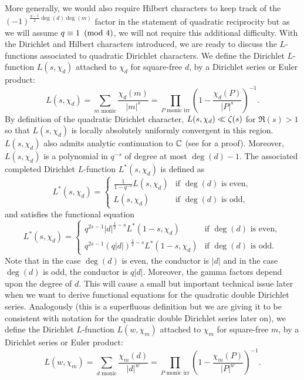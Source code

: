 \documentclass[12pt,reqno,oneside]{amsart}
\begin{document}
    More generally, we would also require Hilbert characters to keep track of the $(-1)^{\frac{q-1}{2}\deg(d)\deg(m)}$ factor in the statement of quadratic reciprocity but as we will assume $q \equiv 1 \ \left(\text{mod }4\right)$, we will not require this additional difficulty. With the Dirichlet and Hilbert characters introduced, we are ready to discuss the $L$-functions associated to quadratic Dirichlet characters. We define the Dirichlet $L$-function $L(s,\chi_{d})$ attached to $\chi_{d}$ for square-free $d$, by a Dirichlet series or Euler product:
    \[
        L(s,\chi_{d}) = \sum_{\text{$m$ monic}}\frac{\chi_{d}(m)}{|m|^{s}} = \prod_{\text{$P$ monic irr}}\left(1-\frac{\chi_{d}(P)}{|P|^{s}}\right)^{-1}.
    \]
    By definition of the quadratic Dirichlet character, $L(s,\chi_{d}) \ll \zeta(s)$ for $\Re(s) > 1$ so that $L(s,\chi_{d})$ is locally absolutely uniformly convergent in this region. $L(s,\chi_{d})$ also admits analytic continuation to $\mathbb{C}$ (see \cite{rosen2002number} for a proof). Moreover, $L(s,\chi_{d})$ is a polynomial in $q^{-s}$ of degree at most $\deg(d)-1$. The associated completed Dirichlet $L$-function $L^{\ast}(s,\chi_{d})$ is defined as
    \[
        L^{\ast}(s,\chi_{d}) = \begin{cases} \frac{1}{1-q^{-s}}L(s,\chi_{d}) & \text{if $\deg(d)$ is even}, \\ L(s,\chi_{d}) & \text{if $\deg(d)$ is odd}, \end{cases}
    \]
    and satisfies the functional equation
    \[
        L^{\ast}(s,\chi_{d}) = \begin{cases} q^{2s-1}|d|^{\frac{1}{2}-s}L^{\ast}(1-s,\chi_{d}) & \text{if $\deg(d)$ is even}, \\ q^{2s-1}(q|d|)^{\frac{1}{2}-s}L^{\ast}(1-s,\chi_{d}) & \text{if $\deg(d)$ is odd}. \end{cases}
    \]
    Note that in the case $\deg(d)$ is even, the conductor is $|d|$ and in the case $\deg(d)$ is odd, the conductor is $q|d|$. Moreover, the gamma factors depend upon the degree of $d$. This will cause a small but important technical issue later when we want to derive functional equations for the quadratic double Dirichlet series. Analogously (this is a superfluous definition but we are giving it to be consistent with notation for the quadratic double Dirichlet series later on), we define the Dirichlet $L$-function $L(w,\chi_{m})$ attached to $\chi_{m}$ for square-free $m$, by a Dirichlet series or Euler product:
    \[
        L(w,\chi_{m}) = \sum_{\text{$d$ monic}}\frac{\chi_{m}(d)}{|d|^{w}} = \prod_{\text{$P$ monic irr}}\left(1-\frac{\chi_{m}(P)}{|P|^{w}}\right)^{-1}.
    \]
\end{document}
